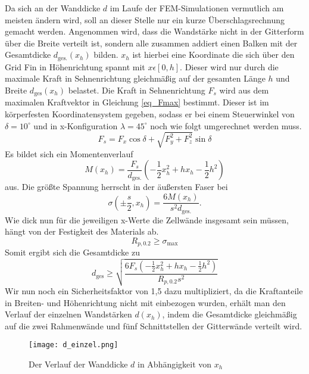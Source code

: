 Da sich an der Wanddicke $d$ im Laufe der FEM-Simulationen vermutlich am meisten ändern wird, soll an dieser Stelle nur ein kurze Überschlagsrechnung gemacht werden. Angenommen wird, dass die Wandstärke nicht in der Gitterform über die Breite verteilt ist, sondern alle zusammen addiert einen Balken mit der Gesamtdicke $d_\mathrm{ges.}(x_h)$ bilden. $x_h$ ist hierbei eine Koordinate die sich über den Grid Fin in Höhenrichtung spannt mit $x \epsilon [0, h]$. Dieser wird nur durch die maximale Kraft in Sehnenrichtung gleichmäßig auf der gesamten Länge $h$ und Breite $d_\mathrm{ges}(x_h)$ belastet. Die Kraft in Sehnenrichtung $F_s$ wird aus dem maximalen Kraftvektor in Gleichung \ref{eq_Fmax} bestimmt. Dieser ist im körperfesten Koordinatensystem gegeben, sodass er bei einem Steuerwinkel von $\delta = 10^\circ$ und in x-Konfiguration $\lambda=45^\circ$ noch wie folgt umgerechnet werden muss.
\begin{equation}
	F_s = F_x\cos{\delta}+\sqrt{F_y^2+F_z^2}\sin{\delta}
\end{equation}
Es bildet sich ein Momentenverlauf 
\begin{equation}
	M(x_h) =\frac{F_{s}}{d_\mathrm{ges.}}\left(-\frac{1}{2}x_h^2+hx_h-\frac{1}{2}h^2\right)
\end{equation}
aus. Die größte Spannung herrscht in der äußersten Faser bei
\begin{equation}
	 \sigma(\pm \frac{s}{2}, x_h)=\frac{6M(x_h)}{s^2d_\mathrm{ges.}}.
\end{equation}
Wie dick nun für die jeweiligen x-Werte die Zellwände insgesamt sein müssen, hängt von der Festigkeit des Materials ab.
\begin{equation}
	R_{p, 0.2} \geq\sigma_\mathrm{max}
\end{equation}
Somit ergibt sich die Gesamtdicke zu
\begin{equation}
	d_\mathrm{ges}\geq \sqrt{\frac{6F_{s}\left(  -\frac{1}{2}x_h^2+hx_h-\frac{1}{2}h^2\right)}{R_{p, 0.2}s^2}}
\end{equation}
Wir nun noch ein Sicherheitsfaktor von 1,5 dazu multipliziert, da die Kraftanteile in Breiten- und Höhenrichtung nicht mit einbezogen wurden, erhält man den Verlauf der einzelnen Wandstärken $d(x_h)$, indem die Gesamtdicke gleichmäßig auf die zwei Rahmenwände und fünf Schnittstellen der Gitterwände verteilt wird.
\begin{figure}[h]
	\centering
	\texttt{[image: d\_einzel.png]}
	\caption{Der Verlauf der Wanddicke $d$ in Abhängigkeit von $x_h$}
	\label{abb_d_einzel}
\end{figure}\\
